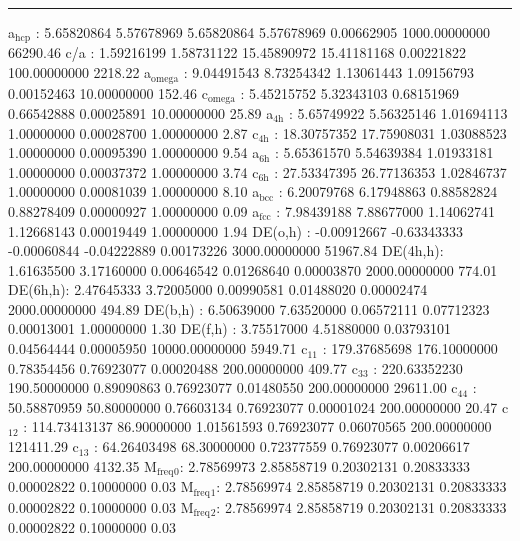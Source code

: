 \documentclass[11pt]{article}
\begin{document}
\noindent\rule{\textwidth}{0.5pt}
a\(_{\text{hcp}}\)   :   5.65820864   5.57678969   5.65820864   5.57678969   0.00662905 1000.00000000     66290.46
c/a     :   1.59216199   1.58731122  15.45890972  15.41181168   0.00221822 100.00000000      2218.22
a\(_{\text{omega}}\) :   9.04491543   8.73254342   1.13061443   1.09156793   0.00152463  10.00000000       152.46
c\(_{\text{omega}}\) :   5.45215752   5.32343103   0.68151969   0.66542888   0.00025891  10.00000000        25.89
a\(_{\text{4h}}\)    :   5.65749922   5.56325146   1.01694113   1.00000000   0.00028700   1.00000000         2.87
c\(_{\text{4h}}\)    :  18.30757352  17.75908031   1.03088523   1.00000000   0.00095390   1.00000000         9.54
a\(_{\text{6h}}\)    :   5.65361570   5.54639384   1.01933181   1.00000000   0.00037372   1.00000000         3.74
c\(_{\text{6h}}\)    :  27.53347395  26.77136353   1.02846737   1.00000000   0.00081039   1.00000000         8.10
a\(_{\text{bcc}}\)   :   6.20079768   6.17948863   0.88582824   0.88278409   0.00000927   1.00000000         0.09
a\(_{\text{fcc}}\)   :   7.98439188   7.88677000   1.14062741   1.12668143   0.00019449   1.00000000         1.94
DE(o,h) :  -0.00912667  -0.63343333  -0.00060844  -0.04222889   0.00173226 3000.00000000     51967.84
DE(4h,h):   1.61635500   3.17160000   0.00646542   0.01268640   0.00003870 2000.00000000       774.01
DE(6h,h):   2.47645333   3.72005000   0.00990581   0.01488020   0.00002474 2000.00000000       494.89
DE(b,h) :   6.50639000   7.63520000   0.06572111   0.07712323   0.00013001   1.00000000         1.30
DE(f,h) :   3.75517000   4.51880000   0.03793101   0.04564444   0.00005950 10000.00000000      5949.71
c\(_{\text{11}}\)    : 179.37685698 176.10000000   0.78354456   0.76923077   0.00020488 200.00000000       409.77
c\(_{\text{33}}\)    : 220.63352230 190.50000000   0.89090863   0.76923077   0.01480550 200.00000000     29611.00
c\(_{\text{44}}\)    :  50.58870959  50.80000000   0.76603134   0.76923077   0.00001024 200.00000000        20.47
c\(_{\text{12}}\)    : 114.73413137  86.90000000   1.01561593   0.76923077   0.06070565 200.00000000    121411.29
c\(_{\text{13}}\)    :  64.26403498  68.30000000   0.72377559   0.76923077   0.00206617 200.00000000      4132.35
M\(_{\text{freq}}\)\(_{\text{0}}\):   2.78569973   2.85858719   0.20302131   0.20833333   0.00002822   0.10000000         0.03
M\(_{\text{freq}}\)\(_{\text{1}}\):   2.78569974   2.85858719   0.20302131   0.20833333   0.00002822   0.10000000         0.03
M\(_{\text{freq}}\)\(_{\text{2}}\):   2.78569974   2.85858719   0.20302131   0.20833333   0.00002822   0.10000000         0.03
\end{document}
